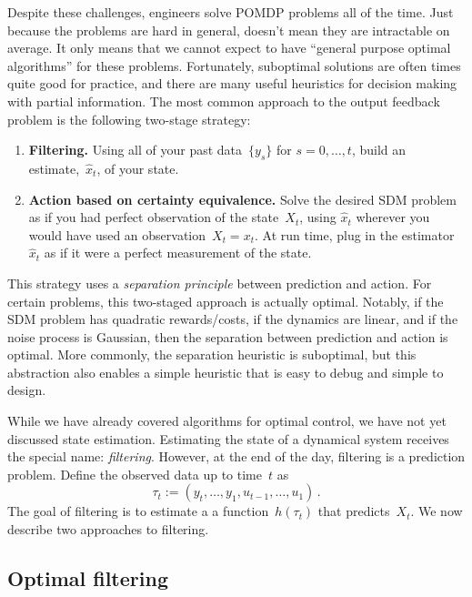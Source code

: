 \documentclass{tufte-book}
\begin{document}
Despite these challenges, engineers solve POMDP problems all of the
time. Just because the problems are hard in general, doesn't mean they
are intractable on average. It only means that we cannot expect to have
``general purpose optimal algorithms'' for these problems. Fortunately,
suboptimal solutions are often times quite good for practice, and there
are many useful heuristics for decision making with partial information.
The most common approach to the output feedback problem is the following
two-stage strategy:

\begin{enumerate}
\def\labelenumi{\arabic{enumi}.}
\item
  \textbf{Filtering.} Using all of your past data~\(\{y_s\}\) for
  \(s=0,\ldots,t\), build an estimate,~\(\hat{x}_t\), of your state.
\item
  \textbf{Action based on certainty equivalence.} Solve the desired SDM
  problem as if you had perfect observation of the state~\(X_t\), using
  \(\hat{x}_t\) wherever you would have used an observation~\(X_t=x_t\).
  At run time, plug in the estimator~\(\hat{x}_t\) as if it were a
  perfect measurement of the state.
\end{enumerate}

This strategy uses a \emph{separation principle} between prediction and
action. For certain problems, this two-staged approach is actually
optimal. Notably, if the SDM problem has quadratic rewards/costs, if the
dynamics are linear, and if the noise process is Gaussian, then the
separation between prediction and action is optimal. More commonly, the
separation heuristic is suboptimal, but this abstraction also enables a
simple heuristic that is easy to debug and simple to
design.

While we have already covered algorithms for optimal control, we have
not yet discussed state estimation. Estimating the state of a dynamical
system receives the special name: \emph{filtering}.
However, at the end of the day, filtering is a prediction problem.
Define the observed data up to time~\(t\) as \[
\tau_t := (y_t,\ldots, y_1, u_{t-1}, \ldots, u_1)\,.
\] The goal of filtering is to estimate a a function~\(h(\tau_t)\) that
predicts~\(X_t\). We now describe two approaches to filtering.

\hypertarget{optimal-filtering}{%
\subsection{Optimal filtering}\label{optimal-filtering}}
\end{document}
